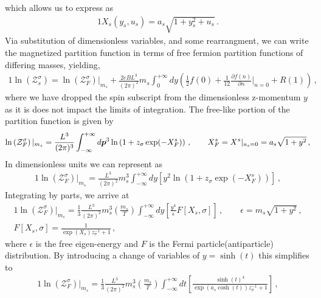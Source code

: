 which allows us to express  as
\begin{alignat}{1}
    \label{UnitlessBoltz} X_{s}(y_{s},u_{s})=a_{s}\sqrt{1+y_{s}^{2}+u_{s}}\,.
\end{alignat}
Via substitution of dimensionless variables, and some rearrangment, we can write the magnetized partition function in terms of free fermion partition functions of differing masses, yielding,
\begin{alignat}{1}
    \label{Equality} \ln\left(\mathcal{Z}^{\sigma}_{s}\right) = \ln\left(\mathcal{Z}^{\sigma}_{F}\right)|_{m_{s}} + \frac{2eBL^{3}}{(2\pi)^{2}}m_{s}\int_{0}^{+\infty}dy\left(\frac{1}{2}f(0) + \frac{1}{12}\frac{\partial f(n)}{\partial n}\bigg\rvert_{n=0} + R(1)\right)\,,
\end{alignat}
where we have dropped the spin subscript from the dimensionless z-momentum $y$ as it is does not impact the limits of integration. The free-like portion of the partition function is given by
\begin{alignat}{1}
    \label{Freelike} \ln\left(\mathcal{Z}^{\sigma}_{F}\right)|_{m_{s}}=\frac{L^{3}}{(2\pi)^{3}}\int^{+\infty}_{-\infty}d\boldsymbol{p}^{3}\ln\left(1+z_{\sigma}\exp(-X^{s}_{F})\right)\,,\qquad X^{s}_{F} = X^{s}\vert_{u_{s}=0} = a_{s}\sqrt{1+y^{2}}\,,
\end{alignat}
In dimensionless units we can represent  as
\begin{alignat}{1}
    \label{FreelikeAlt} \ln\left(\mathcal{Z}^{\sigma}_{F}\right)|_{m_{s}}=\frac{L^{3}}{(2\pi)^{2}}m_{s}^{3}\int^{+\infty}_{-\infty}dy\left[y^{2}\ln\left(1+z_{\sigma}\exp(-X^{s}_{F})\right)\right]\,,
\end{alignat}
Integrating by parts, we arrive at
\begin{alignat}{1}
    \label{FreelikeParts} \ln\left(\mathcal{Z}^{\sigma}_{F}\right)|_{m_{s}}=\frac{1}{3}\frac{L^{3}}{(2\pi)^{2}}m_{s}^{3}\left(\frac{m_{s}}{T}\right)\int^{+\infty}_{-\infty}dy\left[\frac{y^{4}}{\epsilon}F[X_{s},\sigma]\right]\,,\qquad \epsilon=m_{s}\sqrt{1+y^{2}}\,,\\
    \label{FermD} F[X_{s},\sigma] = \frac{1}{\exp(X_{s})z_{\sigma}^{-1}+1}\,,
\end{alignat}
where $\epsilon$ is the free eigen-energy and $F$ is the Fermi particle(antiparticle) distribution. By introducing a change of variables of $y=\sinh(t)$ this simplifies to
\begin{alignat}{1}
    \label{FreelikeFinal} \ln\left(\mathcal{Z}^{\sigma}_{F}\right)|_{m_{s}}=\frac{1}{3}\frac{L^{3}}{(2\pi)^{2}}m_{s}^{3}\left(\frac{m_{s}}{T}\right)\int^{+\infty}_{-\infty}dt\left[\frac{\sinh(t)^{4}}{\exp(a_{s}\cosh(t))z_{\sigma}^{-1}+1}\right]\,,
\end{alignat}
